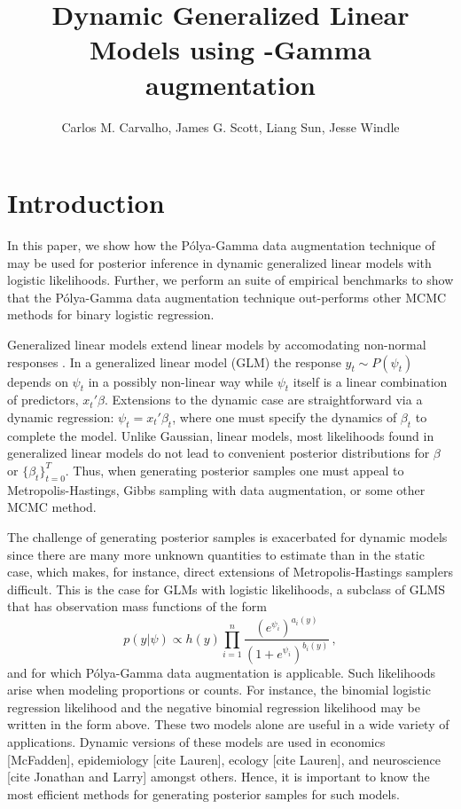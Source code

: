 \documentclass[11pt]{article}
\title{Dynamic Generalized Linear Models using \Polya-Gamma augmentation}
\author{Carlos M. Carvalho, James G. Scott, Liang Sun, Jesse Windle}
\newcommand{\Polya}{P\'{o}lya}
\begin{document}
\maketitle
\tableofcontents

\newpage

\section{Introduction}

In this paper, we show how the \Polya-Gamma data augmentation technique of
\cite{polson-etal-2012} may be used for posterior inference in dynamic
generalized linear models with logistic likelihoods.  Further, we perform an
suite of empirical benchmarks to show that the \Polya-Gamma data augmentation
technique out-performs other MCMC methods for binary logistic regression.

Generalized linear models extend linear models by accomodating non-normal
responses \citep{mccullagh-nelder-1989}.  In a generalized linear model (GLM)
the response $y_t \sim P(\psi_t)$ depends on $\psi_t$ in a possibly non-linear
way while $\psi_t$ itself is a linear combination of predictors, $x_t' \beta$.
Extensions to the dynamic case are straightforward via a dynamic regression:
$\psi_t = x_t' \beta_t$, where one must specify the dynamics of $\beta_t$ to
complete the model.  Unlike Gaussian, linear models, most likelihoods found in
generalized linear models do not lead to convenient posterior distributions for
$\beta$ or $\{\beta_t\}_{t=0}^T$.  Thus, when generating posterior samples one
must appeal to Metropolis-Hastings, Gibbs sampling with data augmentation, or
some other MCMC method.

The challenge of generating posterior samples is exacerbated for dynamic models
since there are many more unknown quantities to estimate than in the static
case, which makes, for instance, direct extensions of Metropolis-Hastings
samplers difficult.  This is the case for GLMs with logistic likelihoods, a
subclass of GLMS that has observation mass functions of the form
\[
p(y | \psi) \propto h(y) \prod_{i=1}^n
\frac{(e^{\psi_i})^{a_i(y)}}{(1+e^{\psi_i})^{b_i(y)}} \, ,
\]
and for which \Polya-Gamma data augmentation is applicable.  Such likelihoods
arise when modeling proportions or counts.  For instance, the binomial logistic
regression likelihood and the negative binomial regression likelihood may be
written in the form above.  These two models alone are useful in a wide variety
of applications.  Dynamic versions of these models are used in economics
[McFadden], epidemiology [cite Lauren], ecology [cite Lauren], and neuroscience
[cite Jonathan and Larry] amongst others.  Hence, it is important to know the
most efficient methods for generating posterior samples for such models.
\end{document}
